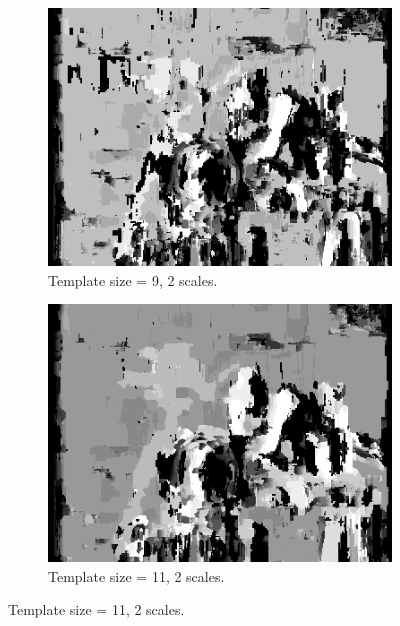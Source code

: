 \documentclass[12pt,a4paper,oneside,final]{article}
\begin{document}
\begin{figure}[H]
\begin{subfigure}[b]{0.24\textwidth}
			\includegraphics[width=\textwidth]{disparity_s2_k9set_1.png}
			\caption{Template size = 9, 2 scales.}
		\end{subfigure}
		\begin{subfigure}[b]{0.24\textwidth}
			\includegraphics[width=\textwidth]{disparity_s2_k11set_1.png}
			\caption{Template size = 11, 2 scales.}
		\end{subfigure}
	\end{figure}
\end{document}
